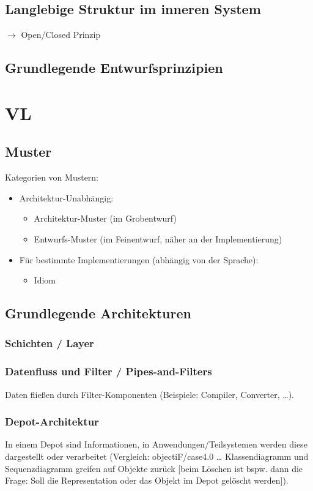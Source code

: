 \documentclass{scrreprt}
\begin{document}
\section{Langlebige Struktur im inneren System}
$\to$ Open/Closed Prinzip
\section{Grundlegende Entwurfsprinzipien}

\chapter{VL} %
\section{Muster}
Kategorien von Mustern:
\begin{itemize}
\item Architektur-Unabhängig:
\begin{itemize}
\item Architektur-Muster (im Grobentwurf)
\item Entwurfs-Muster (im Feinentwurf, näher an der Implementierung)
\end{itemize}
\item Für bestimmte Implementierungen (abhängig von der Sprache):
\begin{itemize}
\item Idiom
\end{itemize}
\end{itemize}

\section{Grundlegende Architekturen}
\subsection{Schichten / Layer}

\subsection{Datenfluss und Filter / Pipes-and-Filters}
Daten fließen durch Filter-Komponenten (Beispiele: Compiler, Converter, …).

\subsection{Depot-Architektur}
In einem Depot sind Informationen, in Anwendungen/Teilsystemen werden diese dargestellt oder verarbeitet (Vergleich: objectiF/case4.0 … Klassendiagramm und Sequenzdiagramm greifen auf Objekte zurück [beim Löschen ist bspw. dann die Frage: Soll die Representation oder das Objekt im Depot gelöscht werden]).
\end{document}
